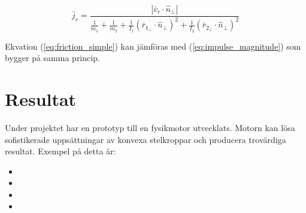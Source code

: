 \documentclass[a4paper,12pt,twopage,swedish]{article}
\begin{document}
\begin{equation}\label{eq:friction_simple}
\bar{j}_r = \frac{|\bar{v}_r \cdot \hat{n}_{\perp}|}{\frac{1}{m_1}+\frac{1}{m_2}+\frac{1}{I_1}(\bar{r}_{1_{\perp}} \cdot \hat{n}_{\perp})^2+\frac{1}{I_2}(\bar{r}_{2_{\perp}} \cdot \hat{n}_{\perp})^2}
\end{equation}

Ekvation (\ref{eq:friction_simple}) kan jämföras med (\ref{eq:impulse_magnitude}) som bygger på samma princip.




\section{Resultat}
Under projektet har en prototyp till en fysikmotor utvecklats. Motorn kan lösa sofistikerade uppsättningar av konvexa stelkroppar och producera trovärdiga resultat. 
Exempel på detta är:

\begin{itemize}
\item {}
\item {}
\item {}
\item {}
\end{itemize}
\end{document}
